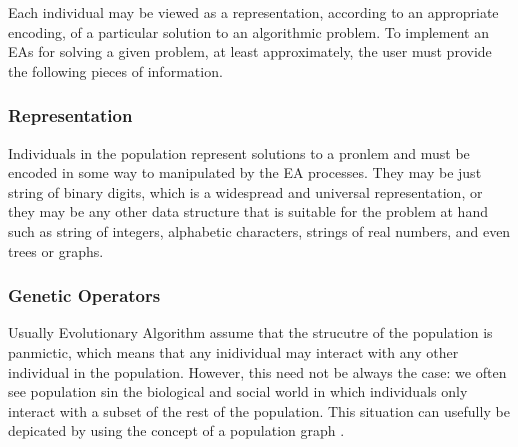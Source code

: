\documentclass{article}
\begin{document}
Each individual may be viewed as a representation, according to an appropriate
encoding, of a particular solution to an algorithmic problem. To implement an
EAs for solving a given problem, at least approximately, the user must provide
the following pieces of information.

\subsubsection{Representation}
Individuals in the population represent solutions to a pronlem and must be
encoded in some way to manipulated by the EA processes. They may be just string
of binary digits, which is a widespread and universal representation, or they
may be any other data structure that is suitable for the problem at hand such as
string of integers, alphabetic characters, strings of real numbers, and even
trees or graphs.
\subsubsection{Genetic Operators}

Usually Evolutionary Algorithm assume that the strucutre of the population is
panmictic, which means that any inidividual may interact with any other individual in the population.
However, this need not be always the case: we often see population sin the
biological and social world in which individuals only interact with a subset of
the rest of the population. This situation can usefully be depicated by using
the concept of a population graph \cite{hoekstra2010simulating}.

{}

\end{document}
